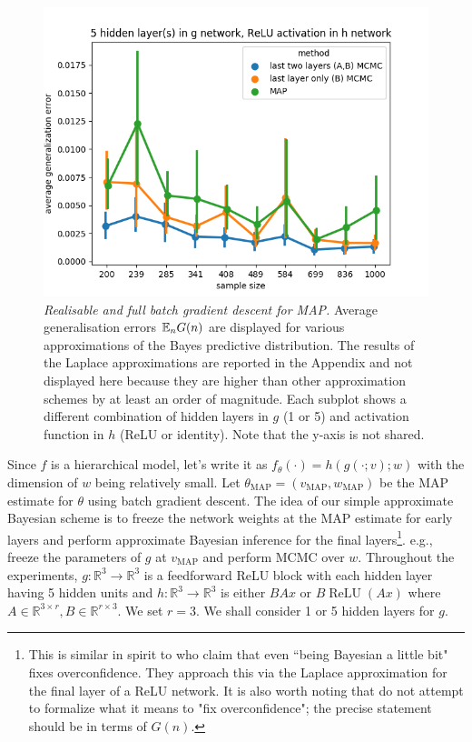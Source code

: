 \documentclass{article} %
\begin{document}
\begin{figure}[h!]
\begin{center}
		\includegraphics[scale=0.35]{taskid11.png}
	\end{center}
	\caption{\textit{Realisable and full batch gradient descent for MAP.} Average generalisation errors $\mathbb{E}_n G(n)$ are displayed for various approximations of the Bayes predictive distribution. The results of the Laplace approximations are reported in the Appendix and not displayed here because they are higher than other approximation schemes by at least an order of magnitude. Each subplot shows a different combination of hidden layers in $g$ (1 or 5) and activation function in $h$ (ReLU or identity). Note that the y-axis is not shared.
	}
	\label{fig:avg_gen_err_fullbatch_realisable}
\end{figure}




 Since $f$ is a hierarchical model, let's write it as $f_\theta(\cdot) = h(g(\cdot;v);w)$ with the dimension of $w$ being relatively small. Let $\theta_{\operatorname{MAP}} = (v_{\operatorname{MAP}}, w_{\operatorname{MAP}})$ be the MAP estimate for $\theta$ using batch gradient descent. The idea of our simple approximate Bayesian scheme is to freeze the network weights at the MAP estimate for early layers and perform approximate Bayesian inference for the final layers\footnote{This is similar in spirit to \citet{kristiadi_being_2020} who claim that even ``being Bayesian a little bit" fixes overconfidence. They approach this via the Laplace approximation for the final layer of a ReLU network. It is also worth noting that \citet{kristiadi_being_2020} do not attempt to formalize what it means to "fix overconfidence"; the precise statement should be in terms of $G(n)$.}. e.g., freeze the parameters of $g$ at $v_{\operatorname{MAP}}$ and perform MCMC over $w$. 
Throughout the experiments, $g: \mathbb R^3 \to \mathbb R^3$ is a feedforward ReLU block with each hidden layer having 5 hidden units and $h: \mathbb R^3 \to \mathbb R^3$ is either $BAx$ or $B \operatorname{ReLU}(Ax)$ where $A \in \mathbb R^{3 \times r}, B \in \mathbb R^{r \times 3}$. We set $r=3$. We shall consider 1 or 5 hidden layers for $g$. 
\end{document}
